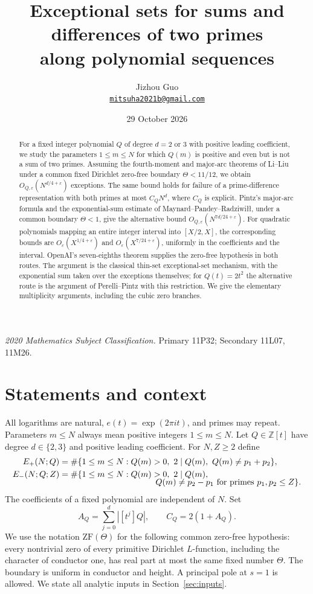 \documentclass[11pt]{article}
\title{Exceptional sets for sums and differences of two primes\protect\\
along polynomial sequences}
\author{Jizhou Guo\\
  \href{mailto:mitsuha2021b@gmail.com}{\texttt{mitsuha2021b@gmail.com}}}
\date{29 October 2026}
\theoremstyle{definition}
\theoremstyle{remark}
\numberwithin{equation}{section}
\newcommand{\eps}{\varepsilon}
\newcommand{\Z}{\mathbb Z}
\newcommand{\abs}[1]{\left\lvert#1\right\rvert}
\begin{document}
\maketitle
\begin{abstract}
For a fixed integer polynomial $Q$ of degree $d=2$ or $3$ with positive
leading coefficient, we study the parameters $1\le m\le N$ for which
$Q(m)$ is positive and even but is not a sum of two primes.
Assuming the fourth-moment and major-arc theorems of Li--Liu under a
common fixed Dirichlet zero-free boundary $\Theta<11/12$, we obtain
$O_{Q,\eps}(N^{d/4+\eps})$ exceptions. The same bound holds for failure
of a prime-difference representation with both primes at most $C_QN^d$,
where $C_Q$ is explicit. Pintz's major-arc formula and the exponential-sum
estimate of Maynard--Pandey--Radziwi\l\l, under a common boundary
$\Theta<1$, give the alternative bound $O_{Q,\eps}(N^{7d/24+\eps})$.
For quadratic polynomials mapping an entire integer interval into
$[X/2,X]$, the corresponding bounds are $O_\eps(X^{1/4+\eps})$ and
$O_\eps(X^{7/24+\eps})$, uniformly in the coefficients and the interval.
OpenAI's seven-eighths theorem supplies the zero-free hypothesis in
both routes. The argument is the classical thin-set exceptional-set
mechanism, with the exponential sum taken over the exceptions themselves;
for $Q(t)=2t^2$ the alternative route is the argument of Perelli--Pintz
with this restriction. We give the elementary multiplicity arguments,
including the cubic zero branches.
\end{abstract}
\noindent\textit{2020 Mathematics Subject Classification.}
Primary 11P32; Secondary 11L07, 11M26.

\section{Statements and context}\label{sec:introduction}

All logarithms are natural, $e(t)=\exp(2\pi it)$, and primes may repeat.
Parameters $m\le N$ always mean positive integers $1\le m\le N$.
Let $Q\in\Z[t]$ have degree $d\in\{2,3\}$ and positive leading
coefficient. For $N,Z\ge2$ define
\begin{align}
 E_+(N;Q)
 &=\#\{1\le m\le N: Q(m)>0,\ 2\mid Q(m),\ Q(m)\ne p_1+p_2\},
       \label{eq:Eplus}\\
 E_-(N;Q;Z)
 &=\#\{1\le m\le N: Q(m)>0,\ 2\mid Q(m),\notag\\[-2mm]
 &\hspace{40mm} Q(m)\ne p_2-p_1
                         \text{ for primes }p_1,p_2\le Z\}.
       \label{eq:Eminus}
\end{align}
The coefficients of a fixed polynomial are independent of $N$.
Set
\begin{equation}\label{eq:CQ}
 A_Q=\sum_{j=0}^d\abs{[t^j]Q},\qquad C_Q=2(1+A_Q).
\end{equation}
We use the notation $\mathrm{ZF}(\Theta)$ for the following common
zero-free hypothesis: every nontrivial zero of every primitive
Dirichlet $L$-function, including the character of conductor one,
has real part at most the same fixed number $\Theta$.
The boundary is uniform in conductor and height. A principal pole at
$s=1$ is allowed. We state all analytic inputs in Section~\ref{sec:inputs}.
\end{document}
